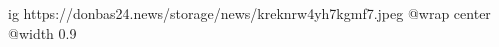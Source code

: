  
 
 
 
 

\ifcmt
  ig https://donbas24.news/storage/news/kreknrw4yh7kgmf7.jpeg
  @wrap center
  @width 0.9
\fi
